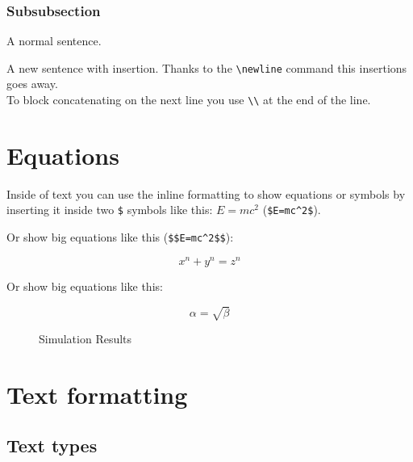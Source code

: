 \documentclass{article}				%
\begin{document}
\subsubsection{Subsubsection}
A normal sentence.

A new sentence with insertion.
\newline
Thanks to the \verb|\newline| command this insertions goes away.\\
To block concatenating on the next line you use \verb|\\| at the end of the line.

\section{Equations}

Inside of text you can use the inline formatting to show equations or symbols by inserting it inside two  \verb|$| symbols like this: $E=mc^2$ (\verb|$E=mc^2$|).

\vspace{5mm} %

Or show big equations like this (\verb|$$E=mc^2$$|):

$$x^n+y^n=z^n$$

Or show big equations like this:

\begin{equation}
\label{simple_equation}
\alpha = \sqrt{ \beta }
\end{equation}


\begin{figure}
    \centering
    \caption{Simulation Results}
    \label{simulationfigure}
\end{figure}

\newpage

\section{Text formatting}
\label{sec:exampleAnchor}

\subsection{Text types}
\end{document}
